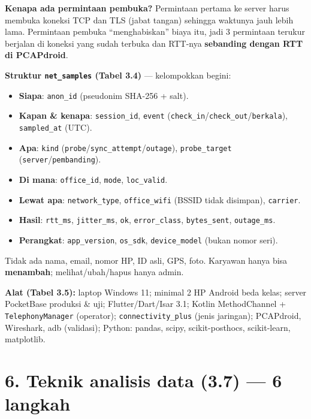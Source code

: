 \begin{hafal}
\textbf{Kenapa ada permintaan pembuka?} Permintaan pertama ke server harus membuka koneksi TCP dan TLS (jabat tangan) sehingga waktunya jauh lebih lama. Permintaan pembuka ``menghabiskan'' biaya itu, jadi 3 permintaan terukur berjalan di koneksi yang sudah terbuka dan RTT-nya \textbf{sebanding dengan RTT di PCAPdroid}.
\end{hafal}

\textbf{Struktur \texttt{net\_samples} (Tabel 3.4)} --- kelompokkan begini:
\begin{itemize}
  \item \textbf{Siapa}: \texttt{anon\_id} (pseudonim SHA-256 + salt).
  \item \textbf{Kapan \& kenapa}: \texttt{session\_id}, \texttt{event} (\texttt{check\_in}/\texttt{check\_out}/\texttt{berkala}), \texttt{sampled\_at} (UTC).
  \item \textbf{Apa}: \texttt{kind} (\texttt{probe}/\texttt{sync\_attempt}/\texttt{outage}), \texttt{probe\_target} (\texttt{server}/\texttt{pembanding}).
  \item \textbf{Di mana}: \texttt{office\_id}, \texttt{mode}, \texttt{loc\_valid}.
  \item \textbf{Lewat apa}: \texttt{network\_type}, \texttt{office\_wifi} (BSSID tidak disimpan), \texttt{carrier}.
  \item \textbf{Hasil}: \texttt{rtt\_ms}, \texttt{jitter\_ms}, \texttt{ok}, \texttt{error\_class}, \texttt{bytes\_sent}, \texttt{outage\_ms}.
  \item \textbf{Perangkat}: \texttt{app\_version}, \texttt{os\_sdk}, \texttt{device\_model} (bukan nomor seri).
\end{itemize}
Tidak ada nama, email, nomor HP, ID asli, GPS, foto. Karyawan hanya bisa \textbf{menambah}; melihat/ubah/hapus hanya admin.

\textbf{Alat (Tabel 3.5):} laptop Windows 11; minimal 2 HP Android beda kelas; server PocketBase produksi \& uji; Flutter/Dart/Isar 3.1; Kotlin MethodChannel + \texttt{TelephonyManager} (operator); \texttt{connectivity\_plus} (jenis jaringan); PCAPdroid, Wireshark, adb (validasi); Python: pandas, scipy, scikit-posthocs, scikit-learn, matplotlib.

\section*{6. Teknik analisis data (3.7) --- 6 langkah}
